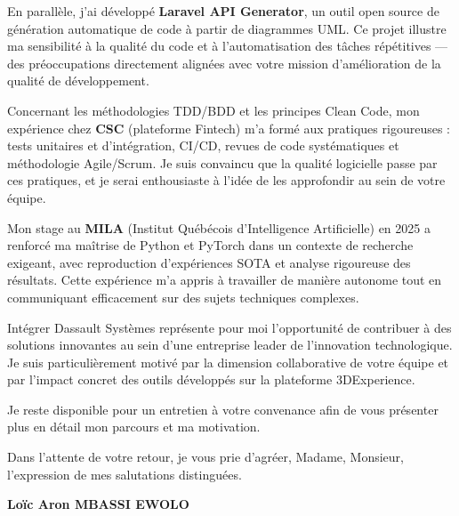 \documentclass[a4paper,11pt]{article}
\begin{document}
\vspace{0.3cm}

En parallèle, j'ai développé \textbf{Laravel API Generator}, un outil open source de génération automatique de code à partir de diagrammes UML. Ce projet illustre ma sensibilité à la qualité du code et à l'automatisation des tâches répétitives — des préoccupations directement alignées avec votre mission d'amélioration de la qualité de développement.

\vspace{0.3cm}

Concernant les méthodologies TDD/BDD et les principes Clean Code, mon expérience chez \textbf{CSC} (plateforme Fintech) m'a formé aux pratiques rigoureuses : tests unitaires et d'intégration, CI/CD, revues de code systématiques et méthodologie Agile/Scrum. Je suis convaincu que la qualité logicielle passe par ces pratiques, et je serai enthousiaste à l'idée de les approfondir au sein de votre équipe.

\vspace{0.3cm}

Mon stage au \textbf{MILA} (Institut Québécois d'Intelligence Artificielle) en 2025 a renforcé ma maîtrise de Python et PyTorch dans un contexte de recherche exigeant, avec reproduction d'expériences SOTA et analyse rigoureuse des résultats. Cette expérience m'a appris à travailler de manière autonome tout en communiquant efficacement sur des sujets techniques complexes.

\vspace{0.3cm}

Intégrer Dassault Systèmes représente pour moi l'opportunité de contribuer à des solutions innovantes au sein d'une entreprise leader de l'innovation technologique. Je suis particulièrement motivé par la dimension collaborative de votre équipe et par l'impact concret des outils développés sur la plateforme 3DExperience.

\vspace{0.3cm}

Je reste disponible pour un entretien à votre convenance afin de vous présenter plus en détail mon parcours et ma motivation.

\vspace{0.4cm}

Dans l'attente de votre retour, je vous prie d'agréer, Madame, Monsieur, l'expression de mes salutations distinguées.

\vspace{1cm}

\noindent \textbf{Loïc Aron MBASSI EWOLO}
\end{document}
